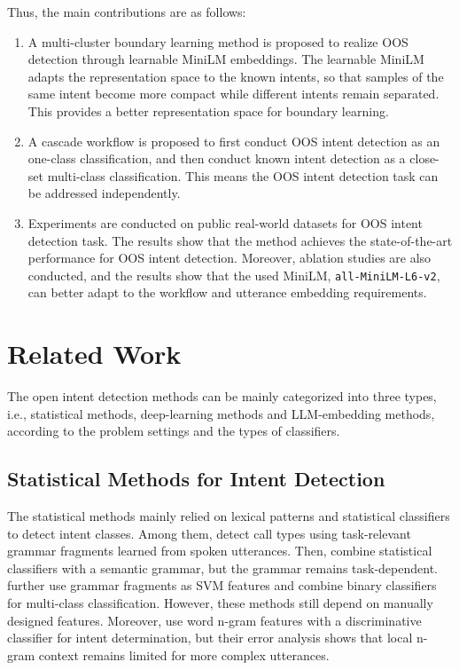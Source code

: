 \documentclass[11pt]{article}
\begin{document}
Thus, the main contributions are as follows:
\begin{enumerate}
    \item[1.] A multi-cluster boundary learning method is proposed to realize OOS detection through learnable MiniLM embeddings. The learnable MiniLM adapts the representation space to the known intents, so that samples of the same intent become more compact while different intents remain separated. This provides a better representation space for boundary learning.
    
    \item[2.] A cascade workflow is proposed to first conduct OOS intent detection as an one-class classification, and then conduct known intent detection as a close-set multi-class classification. This means the OOS intent detection task can be addressed independently. 

    \item[3] Experiments are conducted on public real-world datasets for OOS intent detection task. The results show that the method achieves the state-of-the-art performance for OOS intent detection. Moreover, ablation studies are also conducted, and the results show that the used MiniLM, \texttt{all-MiniLM-L6-v2}, can better adapt to the workflow and utterance embedding requirements.  
\end{enumerate}


\section{Related Work}
The open intent detection methods can be mainly categorized into three types, i.e., statistical methods, deep-learning methods and LLM-embedding methods, according to the problem settings and the types of classifiers.   

\subsection{Statistical Methods for Intent Detection}
The statistical methods mainly relied on lexical patterns and statistical classifiers to detect intent classes. Among them, \citet{gorin1997how} detect call types using task-relevant grammar fragments learned from spoken utterances. Then, \citet{wang2002combination} combine statistical classifiers with a semantic grammar, but the grammar remains task-dependent. \citet{haffner2003optimizing} further use grammar fragments as SVM features and combine binary classifiers for multi-class classification. However, these methods still depend on manually designed features. Moreover, \citet{tur2010what} use word n-gram features with a discriminative classifier for intent determination, but their error analysis shows that local n-gram context remains limited for more complex utterances.
\end{document}
